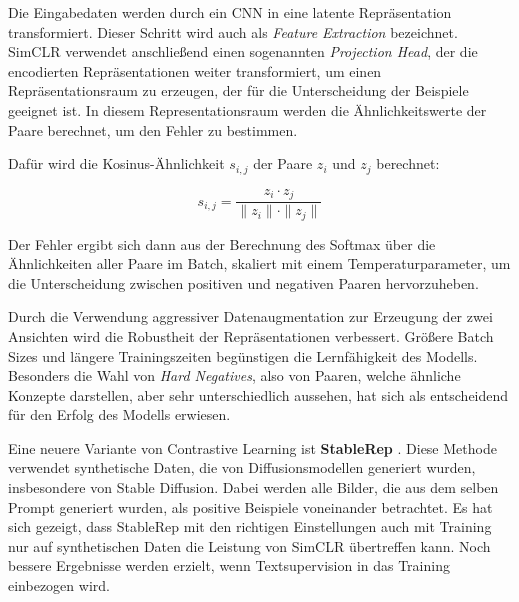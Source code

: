 Die Eingabedaten werden durch ein CNN in eine latente Repräsentation transformiert. Dieser Schritt wird auch als \emph{Feature Extraction} bezeichnet. SimCLR verwendet anschließend einen sogenannten \emph{Projection Head}, der die encodierten Repräsentationen weiter transformiert, um einen Repräsentationsraum zu erzeugen, der für die Unterscheidung der Beispiele geeignet ist. In diesem Representationsraum werden die Ähnlichkeitswerte der Paare berechnet, um den Fehler zu bestimmen.

Dafür wird die Kosinus-Ähnlichkeit $s_{i,j}$ der Paare $z_i$ und $z_j$ berechnet:

\begin{equation}
	s_{i,j} = \frac{z_i \cdot z_j}{\|z_i\| \cdot \|z_j\|}
	\label{eq:cosine-similarity}
\end{equation}

Der Fehler ergibt sich dann aus der Berechnung des Softmax über die Ähnlichkeiten aller Paare im Batch, skaliert mit einem Temperaturparameter, um die Unterscheidung zwischen positiven und negativen Paaren hervorzuheben.

Durch die Verwendung aggressiver Datenaugmentation zur Erzeugung der zwei Ansichten wird die Robustheit der Repräsentationen verbessert. Größere Batch Sizes und längere Trainingszeiten begünstigen die Lernfähigkeit des Modells. Besonders die Wahl von \emph{Hard Negatives}, also von Paaren, welche ähnliche Konzepte darstellen, aber sehr unterschiedlich aussehen, hat sich als entscheidend für den Erfolg des Modells erwiesen.

Eine neuere Variante von Contrastive Learning ist \textbf{StableRep} \parencite{Tian2023stablerep}. Diese Methode verwendet synthetische Daten, die von Diffusionsmodellen generiert wurden, insbesondere von Stable Diffusion. Dabei werden alle Bilder, die aus dem selben Prompt generiert wurden, als positive Beispiele voneinander betrachtet. Es hat sich gezeigt, dass StableRep mit den richtigen Einstellungen auch mit Training nur auf synthetischen Daten die Leistung von SimCLR übertreffen kann. Noch bessere Ergebnisse werden erzielt, wenn Textsupervision in das Training einbezogen wird.

